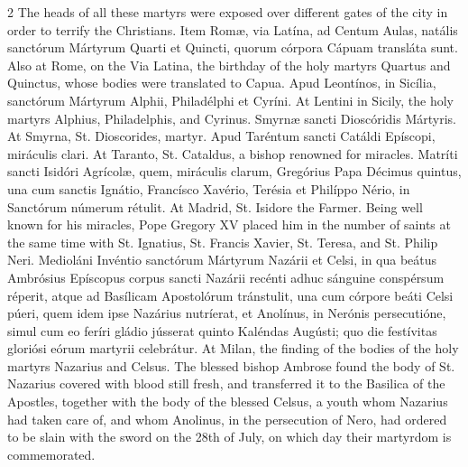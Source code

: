 \begin{paracol}{2}
 The heads of all these martyrs were exposed over different gates of the city 
 in order to terrify the Christians.
\switchcolumn*
{}
Item Romæ, via Latína, 
 ad Centum Aulas, natális sanctórum Mártyrum Quarti et Quincti, quorum 
 córpora Cápuam transláta sunt.
\switchcolumn
{}
Also at Rome, on the Via Latina, 
 the birthday of the holy martyrs Quartus and Quinctus, whose bodies were 
 translated to Capua.
\switchcolumn*
{}
Apud Leontínos, in 
 Sicília, sanctórum Mártyrum Alphii, Philadélphi et Cyríni.
\switchcolumn
{}
At Lentini in Sicily, the holy 
 martyrs Alphius, Philadelphis, and Cyrinus.
\switchcolumn*
{}
Smyrnæ sancti 
 Dioscóridis Mártyris.
\switchcolumn
{}
At Smyrna, St. Dioscorides, martyr.
\switchcolumn*
{}
Apud Taréntum sancti 
 Catáldi Epíscopi, miráculis clari.
\switchcolumn
{}
At Taranto, St. Cataldus, a bishop 
 renowned for miracles.
\switchcolumn*
{}
Matríti sancti Isidóri 
 Agrícolæ, quem, miráculis clarum, Gregórius Papa Décimus quintus, una cum 
 sanctis Ignátio, Francísco Xavério, Terésia et Philíppo Nério, in Sanctórum 
 númerum rétulit.
\switchcolumn
{}
At Madrid, St. Isidore the Farmer. 
 Being well known for his miracles, Pope Gregory XV placed him in the number 
 of saints at the same time with St. Ignatius, St. Francis Xavier, St. 
 Teresa, and St. Philip Neri.
\switchcolumn*
{}
Medioláni Invéntio 
 sanctórum Mártyrum Nazárii et Celsi, in qua beátus Ambrósius Epíscopus 
 corpus sancti Nazárii recénti adhuc sánguine conspérsum réperit, atque ad 
 Basílicam Apostolórum tránstulit, una cum córpore beáti Celsi púeri, quem 
 idem ipse Nazárius nutríerat, et Anolínus, in Nerónis persecutióne, simul 
 cum eo feríri gládio jússerat quinto Kaléndas Augústi; quo die festívitas 
 gloriósi eórum martyrii celebrátur.
\switchcolumn
{}
At Milan, the finding of the bodies 
 of the holy martyrs Nazarius and Celsus. The blessed bishop Ambrose 
 found the body of St. Nazarius covered with blood still fresh, and 
 transferred it to the Basilica of the Apostles, together with the body of 
 the blessed Celsus, a youth whom Nazarius had taken care of, and whom 
 Anolinus, in the persecution of Nero, had ordered to be slain with the sword 
 on the 28th of July, on which day their martyrdom is commemorated.
\switchcolumn*
{}
\end{paracol}


